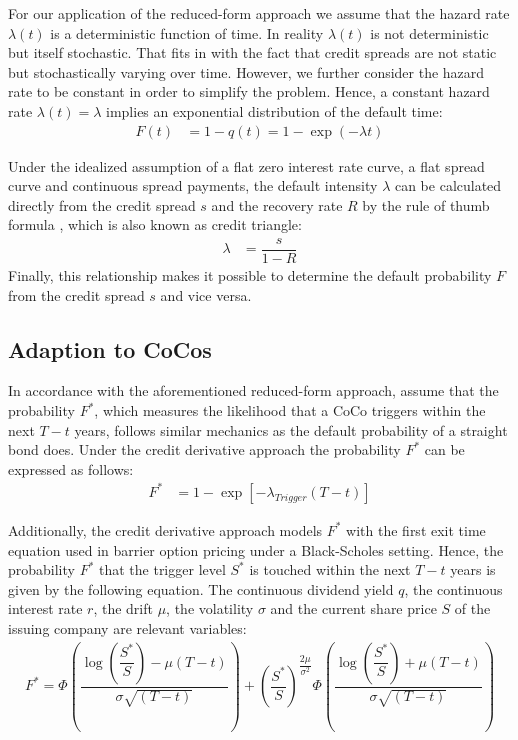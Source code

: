 For our application of the reduced-form approach we assume that the hazard rate $\lambda(t)$ is a deterministic function of time. In reality $\lambda(t)$ is not deterministic but itself stochastic. That fits in with the fact that credit spreads are not static but stochastically varying over time. \citep{lectureschmidt} However, we further consider the hazard rate to be constant in order to simplify the problem. Hence, a constant hazard rate $\lambda(t) = \lambda$ implies an exponential distribution of the default time:
\begin{align} \label{bonddefaultprob}
F(t) &=  1 - q(t) = 1 - \exp (- \lambda t)
\end{align}

Under the idealized assumption of a flat zero interest rate curve, a flat spread curve and continuous spread payments, the default intensity $\lambda$ can be calculated directly from the credit spread $s$ and the recovery rate $R$ by the rule of thumb formula \citep{lectureschmidt}, which is also known as credit triangle: 
\begin{align}
\lambda &= \dfrac{s}{1 - R}
\end{align}
Finally, this relationship makes it possible to determine the default probability $F$ from the credit spread $s$ and vice versa.

\subsection{Adaption to CoCos}
In accordance with the aforementioned reduced-form approach, \citet{de2011pricing} assume that the probability $F^*$, which measures the likelihood that a CoCo triggers within the next $T - t$ years, follows similar mechanics as the default probability of a straight bond does. Under the credit derivative approach the probability $F^*$ can be expressed as follows:
\begin{align} \label{cocodefaultprob}
    F^* &= 1 - \exp\left[- \lambda_{Trigger} (T-t)\right]
\end{align}

Additionally, the credit derivative approach models $F^*$ with the first exit time equation used in barrier option pricing under a Black-Scholes setting. \citep{su2009likely} Hence, the probability $F^*$ that the trigger level $S^*$ is touched within the next $T - t$ years is given by the following equation.  The continuous dividend yield $q$, the continuous interest rate $r$, the drift $\mu$, the volatility $\sigma$ and the current share price $S$ of the issuing company are relevant variables: 
\begin{align}
    F^* = \Phi\left( \dfrac{\log \left(\dfrac{S^*}{S}\right) - \mu (T - t)}{\sigma \sqrt{(T - t)}}\right) + \left(\dfrac{S^*}{S}\right)^{\dfrac{2 \mu}{\sigma^2}} \Phi\left( \dfrac{\log \left(\dfrac{S^*}{S}\right) + \mu (T - t)}{\sigma \sqrt{(T - t)}}\right)
\end{align}

